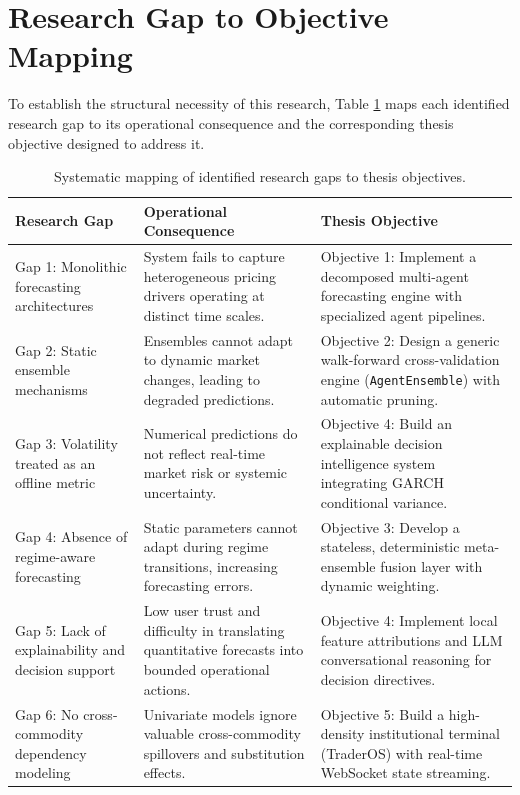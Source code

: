 \documentclass[12pt,a4paper]{report}
\theoremstyle{definition}
\theoremstyle{remark}
\begin{document}
\section{Research Gap to Objective Mapping}

To establish the structural necessity of this research, Table \ref{tab:gap_objective_mapping} maps each identified research gap to its operational consequence and the corresponding thesis objective designed to address it.

\begin{table}[htbp]
\centering
\caption{Systematic mapping of identified research gaps to thesis objectives.}
\label{tab:gap_objective_mapping}
\begin{tabular}{p{3.5cm}|p{5.5cm}|p{5.5cm}}
\hline
\textbf{Research Gap} & \textbf{Operational Consequence} & \textbf{Thesis Objective} \\
\hline
Gap 1: Monolithic forecasting architectures & System fails to capture heterogeneous pricing drivers operating at distinct time scales. & Objective 1: Implement a decomposed multi-agent forecasting engine with specialized agent pipelines. \\
\hline
Gap 2: Static ensemble mechanisms & Ensembles cannot adapt to dynamic market changes, leading to degraded predictions. & Objective 2: Design a generic walk-forward cross-validation engine (\texttt{AgentEnsemble}) with automatic pruning. \\
\hline
Gap 3: Volatility treated as an offline metric & Numerical predictions do not reflect real-time market risk or systemic uncertainty. & Objective 4: Build an explainable decision intelligence system integrating GARCH conditional variance. \\
\hline
Gap 4: Absence of regime-aware forecasting & Static parameters cannot adapt during regime transitions, increasing forecasting errors. & Objective 3: Develop a stateless, deterministic meta-ensemble fusion layer with dynamic weighting. \\
\hline
Gap 5: Lack of explainability and decision support & Low user trust and difficulty in translating quantitative forecasts into bounded operational actions. & Objective 4: Implement local feature attributions and LLM conversational reasoning for decision directives. \\
\hline
Gap 6: No cross-commodity dependency modeling & Univariate models ignore valuable cross-commodity spillovers and substitution effects. & Objective 5: Build a high-density institutional terminal (TraderOS) with real-time WebSocket state streaming. \\
\hline
\end{tabular}
\end{table}
\end{document}
